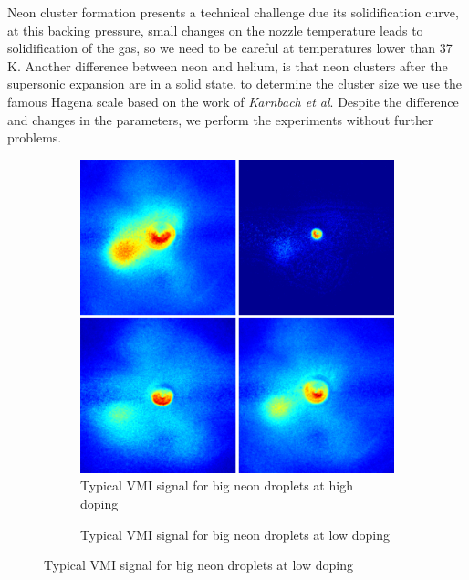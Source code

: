 Neon cluster formation presents a technical challenge due its solidification curve, at this backing pressure, small changes on the nozzle temperature leads to solidification of the gas, so we need to be careful at temperatures lower than 37 K. Another difference between neon and helium, is that neon clusters after the supersonic expansion are in a solid state. to determine the cluster size we use the  famous Hagena scale based on the work of \textit{Karnbach et al}\cite{karnbach_clulu:_1993}. Despite the difference and changes in the parameters, we perform the experiments without further problems.

\begin{figure}[h!]
\hfill
\begin{subfigure}[l]{0.4\textwidth}
\caption{Typical VMI signal for big neon droplets at high doping}
\includegraphics[width=1\textwidth]{../Images/results/MIR_Ne_XeDop_39K/RAw_NE_37KHighdop.png} 
\end{subfigure} 
\begin{subfigure}[l]{0.4\textwidth}
\caption{Typical VMI signal for big neon droplets at low doping}

\end{subfigure}
\end{figure}
